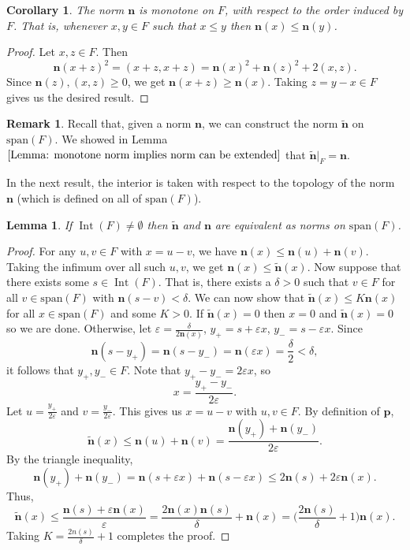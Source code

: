 \documentclass[a4paper,11pt]{article}
\numberwithin{equation}{section}
\theoremstyle{definition}
\newtheorem{Remark}[Definition]{Remark}
\theoremstyle{plain}
\newtheorem{Lemma}[Definition]{Lemma}
\newtheorem{Corollary}[Definition]{Corollary}
\newcommand{\spn}{\mathrm{span}}
\DeclareMathOperator{\Int}{Int}
\let\epsilon\varepsilon
\begin{document}
\begin{Corollary}\label{Cor: Wick norm is monotone}
    The norm $\mathbf{n}$ is monotone on $F$, with respect to the order induced by $F$. That is, whenever $x,y \in F$ such that $x \leq y$ then $\mathbf{n}(x) \leq \mathbf{n}(y)$.
\end{Corollary}
\begin{proof}
    Let $x, z \in F$. Then
    $$\mathbf{n}(x + z)^{2} = (x + z, x + z) = \mathbf{n}(x)^{2} + \mathbf{n}(z)^{2} + 2(x, z).$$
    Since $\mathbf{n}(z), (x, z) \geq 0$, we get $\mathbf{n}(x + z) \geq \mathbf{n}(x)$. Taking $z = y - x \in F$ gives us the desired result.
\end{proof}

\begin{Remark}
    Recall that, given a norm $\mathbf{n}$, we can construct the norm $\tilde{\mathbf{n}}$ on $\spn(F)$. We showed in Lemma $\ref{Lemma: monotone norm implies norm can be extended}$ that $\tilde{\mathbf{n}}|_{F} = \mathbf{n}$.
\end{Remark}

In the next result, the interior is taken with respect to the topology of the norm $\mathbf{n}$ (which is defined on all of $\spn(F)$). 
\begin{Lemma}\label{Lemma: equivilence of norm with extension norm}
    If $\Int(F) \neq \emptyset$ then $\tilde{\mathbf{n}}$ and $\mathbf{n}$ are equivalent as norms on $\spn(F)$.
\end{Lemma}
\begin{proof}
    For any $u, v \in F$ with $x = u - v$, we have $\mathbf n(x) \leq  \mathbf n(u) + \mathbf n(v)$. Taking the infimum over all such $u, v$, we get $\mathbf n(x) \leq \tilde{\mathbf{n}}(x)$. Now suppose that there exists some $s \in \Int(F)$. That is, there exists a $\delta > 0$ such that $v \in F$ for all $v \in \spn(F)$ with $\mathbf n(s - v) < \delta$. We can now show that $\tilde{\mathbf{n}}(x) \leq K \mathbf n(x)$ for all $x \in \spn(F)$ and some $K > 0$. If $\tilde{\mathbf{n}}(x) = 0$ then $x = 0$ and $\tilde{\mathbf{n}}(x) = 0$ so we are done. Otherwise, let $\epsilon = \frac{\delta}{2\mathbf n(x)}$, $y_{+} = s + \epsilon x$, $y_{-} = s - \epsilon x$. Since 
    $$\mathbf n(s - y_{+}) = \mathbf n(s - y_{-}) = \mathbf n(\epsilon x) = \frac{\delta}{2} < \delta,$$
    it follows that $y_{+}, y_{-} \in F$. Note that $y_{+} - y_{-} = 2\epsilon x$, so
    $$x = \frac{y_{+} - y_{-}}{2\epsilon}.$$
    Let $u = \frac{y_{+}}{2 \epsilon}$ and $v = \frac{y_{-}}{2\epsilon}$. This gives us $x = u - v$ with $u, v \in F$. By definition of $\mathbf p$,
    $$\tilde{\mathbf{n}}(x) \leq \mathbf n(u) + \mathbf n(v) = \frac{\mathbf n(y_{+}) + \mathbf n(y_{-})}{2\epsilon}.$$
    By the triangle inequality,
    $$\mathbf n(y_{+}) + \mathbf n(y_{-}) = \mathbf n(s + \epsilon x) + \mathbf n(s - \epsilon x) \leq 2\mathbf n(s) + 2\epsilon \mathbf n(x).$$
    Thus,
    $$\tilde{\mathbf{n}}(x) \leq \frac{\mathbf n(s) + \epsilon \mathbf n(x)}{\epsilon} = \frac{2\mathbf n(x) \mathbf n(s)}{\delta} + \mathbf n(x) = \Big(\frac{2\mathbf n(s)}{\delta} + 1\Big)\mathbf n(x).$$
    Taking $K = \frac{2n(s)}{\delta} + 1$ completes the proof.
\end{proof}
\end{document}
